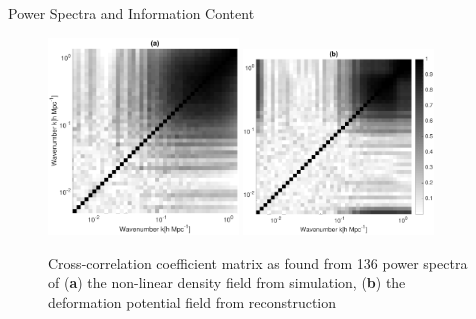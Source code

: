 \begin{section}{Power Spectra and Information Content}
\begin{figure}[t!]
 \centering
  \includegraphics[width=0.45\textwidth]{corrnbnew-crop.pdf}
  \includegraphics[width=0.45\textwidth]{corrrecnew-crop.pdf}
%
  \caption{Cross-correlation coefficient matrix as found from 136 power spectra of (\textbf{a}) the non-linear density field from simulation, (\textbf{b}) the deformation potential field from reconstruction}   

    \label{fig:corrall}


\end{figure}
\end{section}
